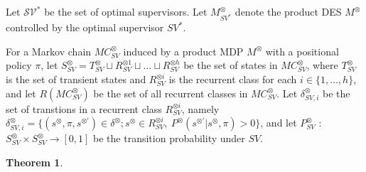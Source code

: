 \documentclass[10pt]{article}
\newtheorem{theorem}{Theorem}
\begin{document}
Let $\mathcal{SV}^{\ast}$ be the set of optimal supervisors. Let $M^{\otimes}_{SV^{\ast}}$ denote the product DES $M^{\otimes}$ controlled by the optimal supervisor $SV^{\ast}$.

For a Markov chain $MC^{\otimes}_{SV}$ induced by a product MDP $M^{\otimes}$ with a positional policy $\pi$, let $S^{\otimes}_{SV}= T^{\otimes}_{SV} \sqcup R^{\otimes 1}_{SV} \sqcup \ldots \sqcup R^{\otimes h}_{SV}$ be the set of states in $MC^{\otimes}_{SV}$, where $T^{\otimes}_{SV}$ is the set of transient states and $R^{\otimes i}_{SV}$ is the recurrent class for each $i \in \{ 1, \ldots ,h \}$, and let $R(MC^{\otimes}_{SV})$ be the set of all recurrent classes in $MC^{\otimes}_{SV}$. Let $\delta^{\otimes}_{SV,i}$ be the set of transtions in a recurrent class $R^{\otimes i}_{SV}$, namely $\delta^{\otimes}_{SV,i} = \{ (s^{\otimes}, \pi, s^{\otimes \prime}) \in \delta^{\otimes} ; s^{\otimes} \in R^{\otimes i}_{SV},\ P^{\otimes}(s^{\otimes \prime}|s^{\otimes}, \pi) > 0 \}$, and let $P^{\otimes}_{SV}$ : $S^{\otimes}_{SV} \times S^{\otimes}_{SV} \rightarrow [0,1]$ be the transition probability under $SV$.

\begin{theorem}

\end{theorem}
\end{document}
